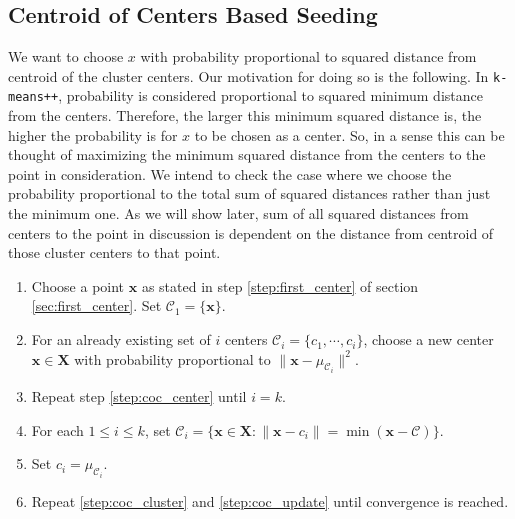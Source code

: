 \documentclass[12pt]{article}
\newcommand{\x}{\mathbf{x}}
\newcommand{\X}{\mathbf{X}}
\newcommand{\C}{\mathcal{C}}
\begin{document}
	\subsection{Centroid of Centers Based Seeding}
	We want to choose $x$ with probability proportional to squared distance from centroid of the cluster centers. Our motivation for doing so is the following. In \texttt{k-means++}, probability is considered proportional to squared minimum distance from the centers. Therefore, the larger this minimum squared distance is, the higher the probability is for $x$ to be chosen as a center. So, in a sense this can be thought of maximizing the minimum squared distance from the centers to the point in consideration. We intend to check the case where we choose the probability proportional to the total sum of squared distances rather than just the minimum one. As we will show later, sum of all squared distances from centers to the point in discussion is dependent on the distance from centroid of those cluster centers to that point.
		\begin{enumerate}[i]
			\item Choose a point $\x$ as stated in step \eqref{step:first_center} of section \eqref{sec:first_center}. Set $\C_1=\{\x\}$.
			\item For an already existing set of $i$ centers $\mathcal{C}_i=\{c_1,\cdots,c_i\}$, choose a new center $\x\in\X$ with probability proportional to $\|\x-\mu_{\C_i}\|^2$.\label{step:coc_center}
			\item Repeat step \eqref{step:coc_center} until $i=k$.
			\item For each $1\leq i\leq k$, set $\C_i=\{\x\in\X:\|\x-c_i\|=\min(\x-\C)\}$.\label{step:coc_cluster}
			\item Set $c_i=\mu_{\C_i}$.\label{step:coc_update}
			\item Repeat \eqref{step:coc_cluster} and \eqref{step:coc_update} until convergence is reached.
		\end{enumerate}
\end{document}
